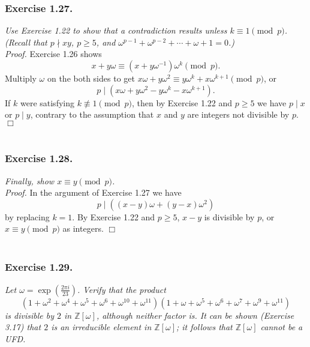 \documentclass{article}
\begin{document}



\subsubsection*{Exercise 1.27.}
\emph{Use Exercise 1.22 to show that a contradiction results unless $k \equiv 1 \pmod{p}$.
(Recall that $p \nmid xy$, $p \geq 5$, and
$\omega^{p-1} + \omega^{p-2} + \cdots + \omega + 1 = 0$.) } \\

\emph{Proof.}
Exercise 1.26 shows
$$x + y\omega \equiv (x + y\omega^{-1}) \omega^k \pmod{p}.$$
Multiply $\omega$ on the both sides to get
$x\omega + y\omega^2 \equiv y\omega^{k} + x\omega^{k+1} \pmod{p}$, or
$$p \mid (x\omega + y\omega^2 - y\omega^{k} - x\omega^{k+1}).$$
If $k$ were satisfying $k \not\equiv 1 \pmod{p}$, then by Exercise 1.22 and $p \geq 5$
we have $p \mid x$ or $p \mid y$, contrary to the assumption that
$x$ and $y$ are integers not divisible by $p$.
$\Box$ \\\\






\subsubsection*{Exercise 1.28.}
\emph{Finally, show $x \equiv y \pmod{p}$.} \\

\emph{Proof.}
In the argument of Exercise 1.27 we have
$$p \mid ((x-y)\omega + (y-x)\omega^2)$$
by replacing $k = 1$.
By Exercise 1.22 and $p \geq 5$, $x - y$ is divisible by $p$,
or $x \equiv y \pmod{p}$ as integers.
$\Box$ \\\\






\subsubsection*{Exercise 1.29.}
\emph{Let $\omega = \exp(\frac{2\pi i}{23})$.
Verify that the product
$$(1+\omega^2+\omega^4+\omega^5+\omega^6+\omega^{10}+\omega^{11})
(1+\omega+\omega^5+\omega^6+\omega^7+\omega^9+\omega^{11})$$
is divisible by $2$ in $\mathbb{Z}[\omega]$,
although neither factor is.
It can be shown (Exercise 3.17) that $2$ is an irreducible element in $\mathbb{Z}[\omega]$;
it follows that $\mathbb{Z}[\omega]$ cannot be a UFD. } \\
\end{document}
